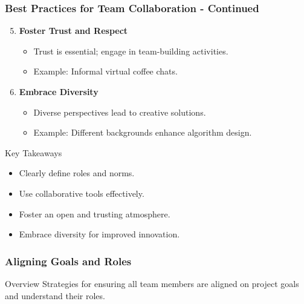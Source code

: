 \documentclass[aspectratio=169]{beamer}
\begin{document}
\begin{frame}[fragile]
    \frametitle{Best Practices for Team Collaboration - Continued}
    \begin{enumerate}
        \setcounter{enumi}{4} %
        \item \textbf{Foster Trust and Respect}
            \begin{itemize}
                \item Trust is essential; engage in team-building activities.
                \item Example: Informal virtual coffee chats.
            \end{itemize}
        
        \item \textbf{Embrace Diversity}
            \begin{itemize}
                \item Diverse perspectives lead to creative solutions.
                \item Example: Different backgrounds enhance algorithm design.
            \end{itemize}
    \end{enumerate}
    
    \begin{block}{Key Takeaways}
        \begin{itemize}
            \item Clearly define roles and norms.
            \item Use collaborative tools effectively.
            \item Foster an open and trusting atmosphere.
            \item Embrace diversity for improved innovation.
        \end{itemize}
    \end{block}
\end{frame}

\begin{frame}[fragile]
    \frametitle{Aligning Goals and Roles}
    \begin{block}{Overview}
        Strategies for ensuring all team members are aligned on project goals and understand their roles.
    \end{block}
\end{frame}
\end{document}
